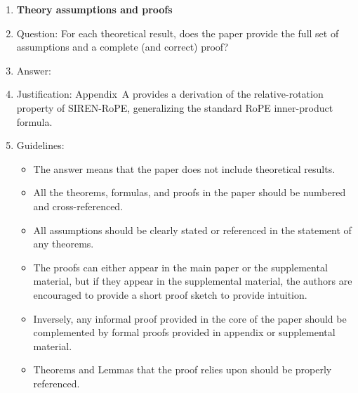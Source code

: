 \begin{enumerate}
\item {\bf Theory assumptions and proofs}
    \item[] Question: For each theoretical result, does the paper provide the full set of assumptions and a complete (and correct) proof?
    \item[] Answer: \answerYes{}
    \item[] Justification: Appendix~A provides a derivation of the relative-rotation property of SIREN-RoPE, generalizing the standard RoPE inner-product formula.
    \item[] Guidelines:
    \begin{itemize}
        \item The answer \answerNA{} means that the paper does not include theoretical results.
        \item All the theorems, formulas, and proofs in the paper should be numbered and cross-referenced.
        \item All assumptions should be clearly stated or referenced in the statement of any theorems.
        \item The proofs can either appear in the main paper or the supplemental material, but if they appear in the supplemental material, the authors are encouraged to provide a short proof sketch to provide intuition.
        \item Inversely, any informal proof provided in the core of the paper should be complemented by formal proofs provided in appendix or supplemental material.
        \item Theorems and Lemmas that the proof relies upon should be properly referenced.
    \end{itemize}


\end{enumerate}
